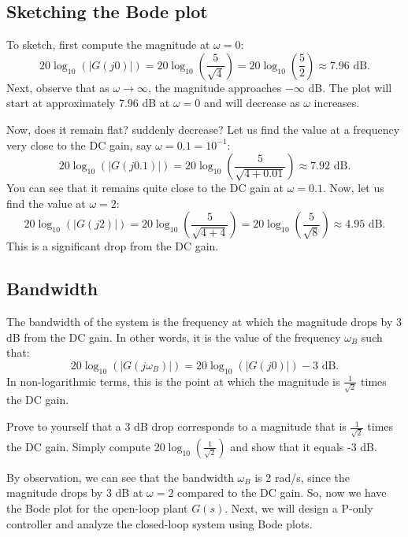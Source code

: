 \documentclass{ee122_notes}
\begin{document}
\subsection{Sketching the Bode plot}
To sketch, first compute the magnitude at $\omega = 0$:
\[
20\log_{10}(|G(j0)|) = 20\log_{10}\left(\frac{5}{\sqrt{4}}\right) = 20\log_{10}\left(\frac{5}{2}\right) \approx 7.96 \text{ dB}.
\]
Next, observe that as $\omega \to \infty$, the magnitude approaches $-\infty$ dB. The plot will start at approximately 7.96 dB at $\omega = 0$ and will decrease as $\omega$ increases. 

Now, does it remain flat? suddenly decrease? Let us find the value at a frequency very close to the DC gain, say $\omega = 0.1 = 10^{-1}$:
\[
20\log_{10}(|G(j0.1)|) = 20\log_{10}\left(\frac{5}{\sqrt{4 + 0.01}}\right) \approx 7.92 \text{ dB}.
\]
You can see that it remains quite close to the DC gain at $\omega = 0.1$. Now, let us find the value at $\omega = 2$:
\[
20\log_{10}(|G(j2)|) = 20\log_{10}\left(\frac{5}{\sqrt{4 + 4}}\right) = 20\log_{10}\left(\frac{5}{\sqrt{8}}\right) \approx 4.95 \text{ dB}.
\]
This is a significant drop from the DC gain. 
\subsection{Bandwidth}
The bandwidth of the system is the frequency at which the magnitude drops by 3 dB from the DC gain. In other words, it is the value of the frequency $\omega_B$ such that:
\[
20\log_{10}(|G(j\omega_B)|) = 20\log_{10}(|G(j0)|) - 3 \text{ dB}.
\]
In non-logarithmic terms, this is the point at which the magnitude is $\frac{1}{\sqrt{2}}$ times the DC gain.

\begin{popquiz}
Prove to yourself that a 3 dB drop corresponds to a magnitude that is $\frac{1}{\sqrt{2}}$ times the DC gain. 
\popqsplit
Simply compute $20\log_{10}\left(\frac{1}{\sqrt{2}}\right)$ and show that it equals -3 dB.
\end{popquiz}
By observation, we can see that the bandwidth $\omega_B$ is 2 rad/s, since the magnitude drops by 3 dB at $\omega = 2$ compared to the DC gain.
So, now we have the Bode plot for the open-loop plant $G(s)$. Next, we will design a P-only controller and analyze the closed-loop system using Bode plots.
\end{document}
